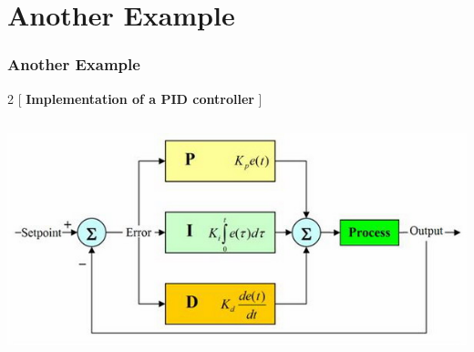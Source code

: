 \documentclass[hyperref={pdfpagelayout=SinglePage}]{beamer}
\begin{document}
\section{Another Example}
	\begin{frame} \frametitle{Another Example}
		\begin{multicols*}{2}
		[ \center \textbf{Implementation of a PID controller} ]
		\inputminted[fontsize=\tiny]{hs}{code/pid/pid.hs}
		\includegraphics[scale=0.25,keepaspectratio]{pics/pid.jpg}
		\end{multicols*}		
	\end{frame}	
\end{document}
